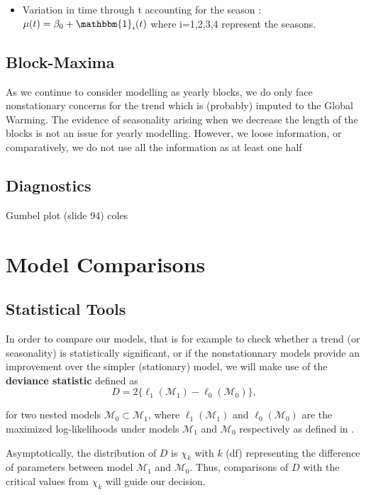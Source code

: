 \begin{itemize}
	\item Variation in time through t accounting for the season : $\mu (t)=\beta_0+\mathbbm{1}_i(t)$ where i=1,2,3,4 represent the seasons.
\end{itemize}



\subsection{Block-Maxima}

As we continue to consider modelling as yearly blocks, we do only face nonstationary concerns for the trend which is (probably) imputed to the Global Warming. 
The evidence of seasonality arising when we decrease the length of the blocks is not an issue for yearly modelling. However, we loose information, or comparatively, we do not use all the information as at least one half 


\subsection{Diagnostics}
Gumbel plot (slide 94) coles


\section{Model Comparisons}

\subsection{Statistical Tools}

In order to compare our models, that is for example to check whether a trend (or seasonality) is statistically significant, or if the nonstationnary models provide an improvement over the simpler (stationary) model, we will make use of the \textbf{deviance statistic} defined as 
\begin{equation}
D = 2\big\{\ell_1(\mathcal{M}_1)-\ell_0(\mathcal{M}_0)\big\},
\end{equation}

for two nested models $\mathcal{M}_0\subset \mathcal{M}_1$, where $\ell_1(\mathcal{M}_1)$ and $\ell_0(\mathcal{M}_0)$ are the maximized log-likelihoods under models $\mathcal{M}_1$ and $\mathcal{M}_0$ respectively as defined in .

Asymptotically, the distribution of $D$ is $\chi_k$ with $k$ (df) representing the difference of parameters between model $\mathcal{M}_1$ and $\mathcal{M}_0$. Thus, comparisons of $D$ with the critical values from $\chi_k$ will guide our decision.


